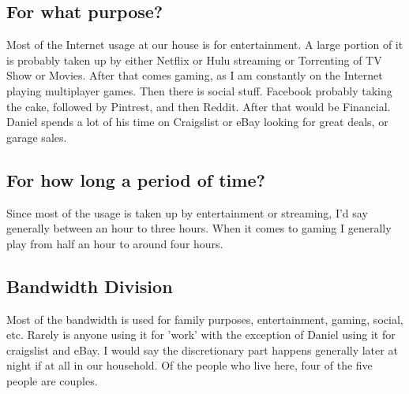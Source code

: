 \documentclass[12pt,letterpaper]{article}
\begin{document}
\subsection{For what purpose?}
Most of the Internet usage at our house is for entertainment. A large
portion of it is probably taken up by either Netflix or Hulu streaming or
Torrenting of TV Show or Movies. After that comes gaming, as I am
constantly on the Internet playing multiplayer games. Then there is
social stuff. Facebook probably taking the cake, followed by Pintrest,
and then Reddit. After that would be Financial. Daniel spends a lot of
his time on Craigslist or eBay looking for great deals, or garage sales.

\subsection{For how long a period of time?}
Since most of the usage is taken up by entertainment or streaming, I'd
say generally between an hour to three hours. When it comes to gaming I
generally play from half an hour to around four hours.

\subsection{Bandwidth Division}
Most of the bandwidth is used for family purposes, entertainment,
gaming, social, etc. Rarely is anyone using it for 'work' with the
exception of Daniel using it for craigslist and eBay. I would say the
discretionary part happens generally later at night if at all in our
household. Of the people who live here, four of the five people are
couples.
\end{document}
